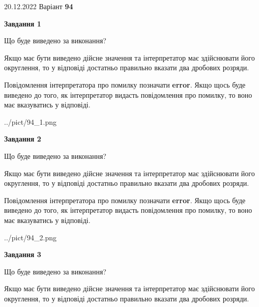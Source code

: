 \documentclass[12pt, ukrainian]{article}
\begin{document}
{20.12.2022 Варіант \No \textbf { 94 }\par}
{
\begin {Large}

{\begin {center}\textbf{Завдання 1}\end {center}}\par
Що буде виведено за виконання? \par

Якщо має бути виведено дійсне значення та інтерпретатор має здійснювати його округлення, 
то у відповіді достатньо правильно вказати два дробових розряди.

Повідомлення інтерпретатора про помилку позначати \textbf{error}.
Якщо щось буде виведено до того, як інтерпретатор видасть повідомлення про помилку, 
то воно має вказуватись у відповіді. \par

\begin{center}
	{../pict/94_1.png}
\end{center}
\newpage

{\begin {center}\textbf{Завдання 2}\end {center}}\par
Що буде виведено за виконання? \par

Якщо має бути виведено дійсне значення та інтерпретатор має здійснювати його округлення, 
то у відповіді достатньо правильно вказати два дробових розряди.

Повідомлення інтерпретатора про помилку позначати \textbf{error}.
Якщо щось буде виведено до того, як інтерпретатор видасть повідомлення про помилку, 
то воно має вказуватись у відповіді. \par

\begin{center}
	{../pict/94_2.png}
\end{center}
\newpage

{\begin {center}\textbf{Завдання 3}\end {center}}\par
Що буде виведено за виконання? \par

Якщо має бути виведено дійсне значення та інтерпретатор має здійснювати його округлення, 
то у відповіді достатньо правильно вказати два дробових розряди.


\end{Large}}
\end{document}
